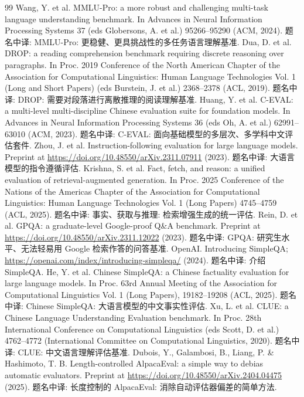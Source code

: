 \begin{thebibliography}{99}
 Wang, Y. et al. MMLU-Pro: a more robust and challenging multi-task language understanding benchmark. In Advances in Neural Information Processing Systems 37 (eds Globersons, A. et al.) 95266--95290 (ACM, 2024). 题名中译: MMLU-Pro: 更稳健、更具挑战性的多任务语言理解基准.
 Dua, D. et al. DROP: a reading comprehension benchmark requiring discrete reasoning over paragraphs. In Proc. 2019 Conference of the North American Chapter of the Association for Computational Linguistics: Human Language Technologies Vol. 1 (Long and Short Papers) (eds Burstein, J. et al.) 2368--2378 (ACL, 2019). 题名中译: DROP: 需要对段落进行离散推理的阅读理解基准.
 Huang, Y. et al. C-EVAL: a multi-level multi-discipline Chinese evaluation suite for foundation models. In Advances in Neural Information Processing Systems 36 (eds Oh, A. et al.) 62991--63010 (ACM, 2023). 题名中译: C-EVAL: 面向基础模型的多层次、多学科中文评估套件.
 Zhou, J. et al. Instruction-following evaluation for large language models. Preprint at \url{https://doi.org/10.48550/arXiv.2311.07911} (2023). 题名中译: 大语言模型的指令遵循评估.
 Krishna, S. et al. Fact, fetch, and reason: a unified evaluation of retrieval-augmented generation. In Proc. 2025 Conference of the Nations of the Americas Chapter of the Association for Computational Linguistics: Human Language Technologies Vol. 1 (Long Papers) 4745--4759 (ACL, 2025). 题名中译: 事实、获取与推理: 检索增强生成的统一评估.
 Rein, D. et al. GPQA: a graduate-level Google-proof Q\&A benchmark. Preprint at \url{https://doi.org/10.48550/arXiv.2311.12022} (2023). 题名中译: GPQA: 研究生水平、无法轻易用 Google 检索作答的问答基准.
 OpenAI. Introducing SimpleQA; \url{https://openai.com/index/introducing-simpleqa/} (2024). 题名中译: 介绍 SimpleQA.
 He, Y. et al. Chinese SimpleQA: a Chinese factuality evaluation for large language models. In Proc. 63rd Annual Meeting of the Association for Computational Linguistics Vol. 1 (Long Papers), 19182--19208 (ACL, 2025). 题名中译: Chinese SimpleQA: 大语言模型的中文事实性评估.
 Xu, L. et al. CLUE: a Chinese Language Understanding Evaluation benchmark. In Proc. 28th International Conference on Computational Linguistics (eds Scott, D. et al.) 4762--4772 (International Committee on Computational Linguistics, 2020). 题名中译: CLUE: 中文语言理解评估基准.
 Dubois, Y., Galambosi, B., Liang, P. \& Hashimoto, T. B. Length-controlled AlpacaEval: a simple way to debias automatic evaluators. Preprint at \url{https://doi.org/10.48550/arXiv.2404.04475} (2025). 题名中译: 长度控制的 AlpacaEval: 消除自动评估器偏差的简单方法.

\end{thebibliography}
